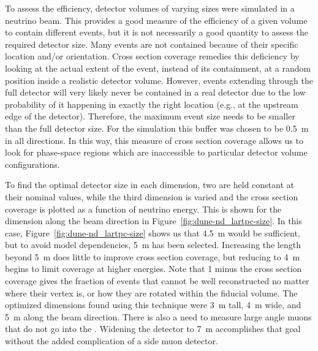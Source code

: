 To assess the efficiency, detector volumes of varying sizes were simulated in a neutrino beam.
This provides a good measure of the efficiency of a given volume to contain different events, but it is not necessarily a good quantity to assess the required detector size.
Many events are not contained because of their specific location and/or orientation.
Cross section coverage remedies this deficiency by looking at the actual extent of the event, instead of its containment, at a random position inside a realistic detector volume.
However, events extending through the full detector will very likely never be contained in a real detector due to the low probability of it happening in exactly the right location (e.g., at the upstream edge of the detector).
Therefore, the maximum event size needs to be smaller than the full detector size.
For the  simulation this buffer was chosen to be \SI{0.5}{\metre} in all directions.
In this way, this measure of cross section coverage allows us to look for phase-space regions which are inaccessible to particular detector volume configurations.

To find the optimal detector size in each dimension, two are held constant at their nominal values, while the third dimension is varied and the cross section coverage is plotted as a function of neutrino energy. 
This is shown for the dimension along the beam direction in Figure~\ref{fig:dune-nd_lartpc-size}. In this case, Figure~\ref{fig:dune-nd_lartpc-size} shows us that
\SI{4.5}{\metre} would be sufficient, but to avoid model dependencies, \SI{5}{\metre} has been selected.
Increasing the length beyond \SI{5}{\metre} does little to improve cross section coverage, but reducing to \SI{4}{\metre} begins to limit coverage at higher energies.
Note that 1 minus the cross section coverage gives the fraction of events that cannot be well reconstructed no matter where their vertex is, or how they are rotated within the fiducial volume. The optimized dimensions found using this technique were \SI{3}{\metre} tall, \SI{4}{\metre} wide, and \SI{5}{\metre} along the beam direction. There is also a need to measure large angle muons that do not go into the . Widening the detector to \SI{7}{\metre} accomplishes that goal without the added complication of a side muon detector. 



